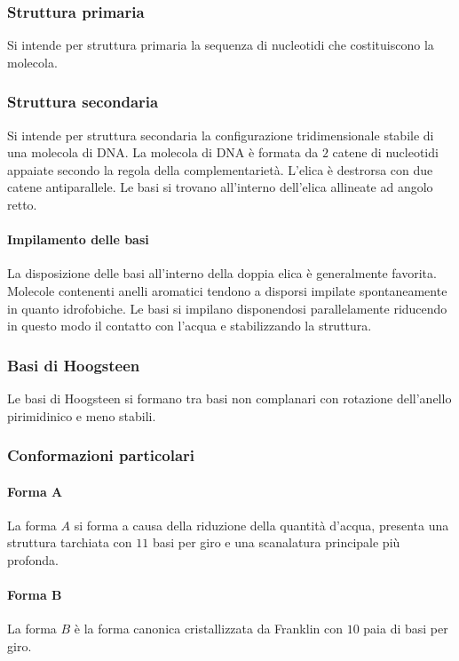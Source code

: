 		\subsubsection{Struttura primaria}
		Si intende per struttura primaria la sequenza di nucleotidi che costituiscono la molecola.

		\subsubsection{Struttura secondaria}
		Si intende per struttura secondaria la configurazione tridimensionale stabile di una molecola di DNA.
		La molecola di DNA \`e formata da $2$ catene di nucleotidi appaiate secondo la regola della complementariet\`a.
		L'elica \`e destrorsa con due catene antiparallele.
		Le basi si trovano all'interno dell'elica allineate ad angolo retto.

			\paragraph{Impilamento delle basi}
			La disposizione delle basi all'interno della doppia elica \`e generalmente favorita.
			Molecole contenenti anelli aromatici tendono a disporsi impilate spontaneamente in quanto idrofobiche.
			Le basi si impilano disponendosi parallelamente riducendo in questo modo il contatto con l'acqua e stabilizzando la struttura.

		\subsubsection{Basi di Hoogsteen}
		Le basi di Hoogsteen si formano tra basi non complanari con rotazione dell'anello pirimidinico e meno stabili.

		\subsubsection{Conformazioni particolari}
			
			\paragraph{Forma $\mathbf{A}$}
			La forma $A$ si forma a causa della riduzione della quantit\`a d'acqua, presenta una struttura tarchiata con $11$ basi per giro e una scanalatura principale pi\`u profonda.

			\paragraph{Forma $\mathbf{B}$}
			La forma $B$ \`e la forma canonica cristallizzata da Franklin con $10$ paia di basi per giro.

